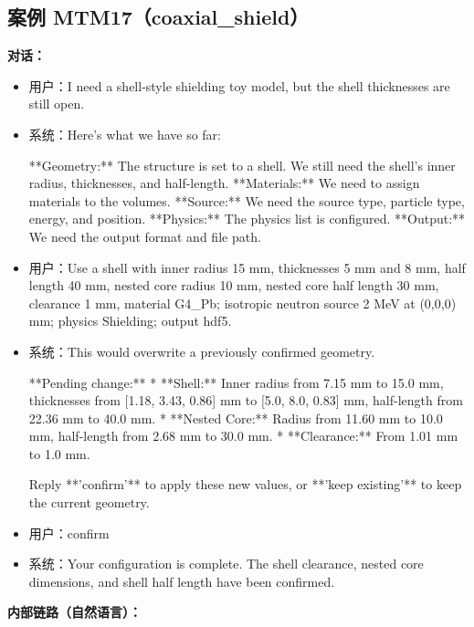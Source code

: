 \documentclass[11pt]{ctexart}
\begin{document}
\subsection{案例 MTM17（coaxial\_shield）}
\textbf{对话：}
\begin{itemize}
\item 用户：I need a shell-style shielding toy model, but the shell thicknesses are still open.
\item 系统：Here's what we have so far:

**Geometry:** The structure is set to a shell. We still need the shell's inner radius, thicknesses, and half-length.
**Materials:** We need to assign materials to the volumes.
**Source:** We need the source type, particle type, energy, and position.
**Physics:** The physics list is configured.
**Output:** We need the output format and file path.
\item 用户：Use a shell with inner radius 15 mm, thicknesses 5 mm and 8 mm, half length 40 mm, nested core radius 10 mm, nested core half length 30 mm, clearance 1 mm, material G4\_Pb; isotropic neutron source 2 MeV at (0,0,0) mm; physics Shielding; output hdf5.
\item 系统：This would overwrite a previously confirmed geometry.

**Pending change:**
*   **Shell:** Inner radius from 7.15 mm to 15.0 mm, thicknesses from [1.18, 3.43, 0.86] mm to [5.0, 8.0, 0.83] mm, half-length from 22.36 mm to 40.0 mm.
*   **Nested Core:** Radius from 11.60 mm to 10.0 mm, half-length from 2.68 mm to 30.0 mm.
*   **Clearance:** From 1.01 mm to 1.0 mm.

Reply **'confirm'** to apply these new values, or **'keep existing'** to keep the current geometry.
\item 用户：confirm
\item 系统：Your configuration is complete. The shell clearance, nested core dimensions, and shell half length have been confirmed.
\end{itemize}
\textbf{内部链路（自然语言）：}
\end{document}
